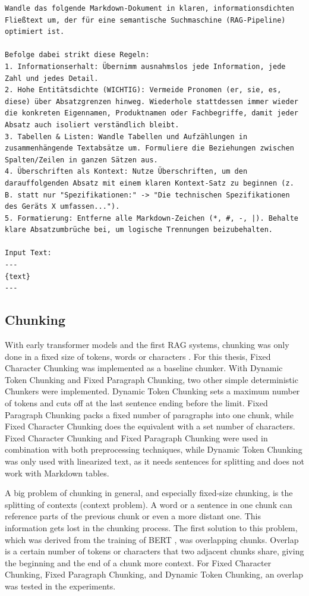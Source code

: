 \documentclass[12pt]{article} %
\begin{document}
\begin{lstlisting}[breaklines=true, basicstyle=\ttfamily,caption={Prompt for Linearization from Markdown to Text}, label=lst:direct_llm]
Wandle das folgende Markdown-Dokument in klaren, informationsdichten Fließtext um, der für eine semantische Suchmaschine (RAG-Pipeline) optimiert ist.

Befolge dabei strikt diese Regeln:
1. Informationserhalt: Übernimm ausnahmslos jede Information, jede Zahl und jedes Detail.
2. Hohe Entitätsdichte (WICHTIG): Vermeide Pronomen (er, sie, es, diese) über Absatzgrenzen hinweg. Wiederhole stattdessen immer wieder die konkreten Eigennamen, Produktnamen oder Fachbegriffe, damit jeder Absatz auch isoliert verständlich bleibt.
3. Tabellen & Listen: Wandle Tabellen und Aufzählungen in zusammenhängende Textabsätze um. Formuliere die Beziehungen zwischen Spalten/Zeilen in ganzen Sätzen aus.
4. Überschriften als Kontext: Nutze Überschriften, um den darauffolgenden Absatz mit einem klaren Kontext-Satz zu beginnen (z. B. statt nur "Spezifikationen:" -> "Die technischen Spezifikationen des Geräts X umfassen...").
5. Formatierung: Entferne alle Markdown-Zeichen (*, #, -, |). Behalte klare Absatzumbrüche bei, um logische Trennungen beizubehalten.

Input Text:
---
{text}
---
\end{lstlisting}
\subsection{Chunking}
With early transformer models and the first RAG systems, chunking was only done in a fixed size of tokens, words or characters \parencite{dai2019transformer, lewis2020retrieval}. For this thesis, Fixed Character Chunking was implemented as a baseline chunker. With Dynamic Token Chunking and Fixed Paragraph Chunking, two other simple deterministic Chunkers were implemented. Dynamic Token Chunking sets a maximum number of tokens and cuts off at the last sentence ending before the limit. Fixed Paragraph Chunking packs a fixed number of paragraphs into one chunk, while Fixed Character Chunking does the equivalent with a set number of characters. Fixed Character Chunking and Fixed Paragraph Chunking were used in combination with both preprocessing techniques, while Dynamic Token Chunking was only used with linearized text, as it needs sentences for splitting and does not work with Markdown tables.

A big problem of chunking in general, and especially fixed-size chunking, is the splitting of contexts (context problem). A word or a sentence in one chunk can reference parts of the previous chunk or even a more distant one. This information gets lost in the chunking process. The first solution to this problem, which was derived from the training of BERT \parencite{devlin2019bert}, was overlapping chunks. Overlap is a certain number of tokens or characters that two adjacent chunks share, giving the beginning and the end of a chunk more context. For Fixed Character Chunking, Fixed Paragraph Chunking, and Dynamic Token Chunking, an overlap was tested in the experiments.
\end{document}
